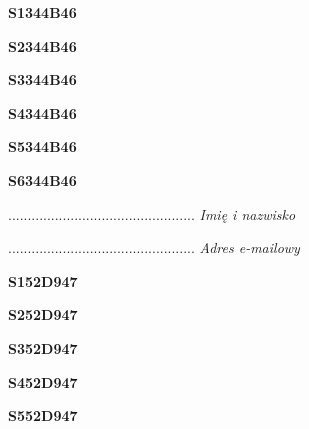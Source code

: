 \begin{turn}{90}\huge \textbf{S1344B46}\end{turn}

\begin{turn}{90}\huge \textbf{S2344B46}\end{turn}

\begin{turn}{90}\huge \textbf{S3344B46}\end{turn}

\begin{turn}{90}\huge \textbf{S4344B46}\end{turn}

\begin{turn}{90}\huge \textbf{S5344B46}\end{turn}

\begin{turn}{90}\huge \textbf{S6344B46}\end{turn}

\begin{turn}{90}\begin{minipage}{\linewidth} \vspace{20mm} ................................................  \textit{Imię i nazwisko}\end{minipage}\end{turn}

\begin{turn}{90}\begin{minipage}{\linewidth} \vspace{20mm} ................................................  \textit{Adres e-mailowy}\end{minipage}\end{turn}

\begin{turn}{90}\huge \textbf{S152D947}\end{turn}

\begin{turn}{90}\huge \textbf{S252D947}\end{turn}

\begin{turn}{90}\huge \textbf{S352D947}\end{turn}

\begin{turn}{90}\huge \textbf{S452D947}\end{turn}

\begin{turn}{90}\huge \textbf{S552D947}\end{turn}

